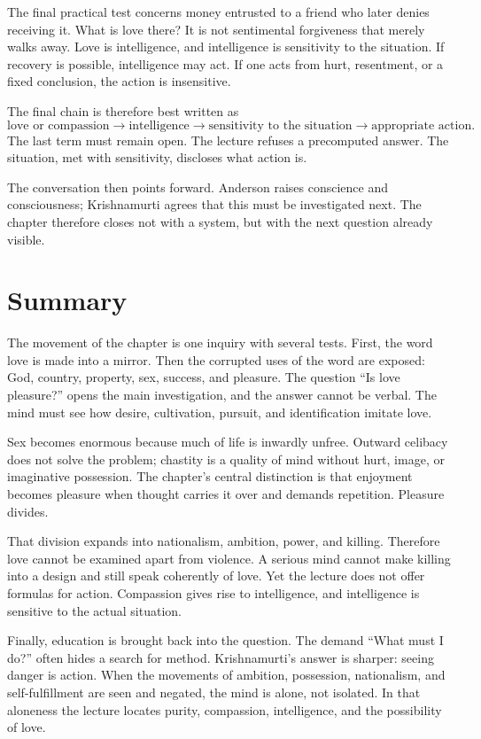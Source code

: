 The final practical test concerns money entrusted to a friend who later denies receiving it. What is love there? It is not sentimental forgiveness that merely walks away. Love is intelligence, and intelligence is sensitivity to the situation. If recovery is possible, intelligence may act. If one acts from hurt, resentment, or a fixed conclusion, the action is insensitive.

The final chain is therefore best written as
\begin{equation}
\text{love or compassion}
\longrightarrow
\text{intelligence}
\longrightarrow
\text{sensitivity to the situation}
\longrightarrow
\text{appropriate action}.
\end{equation}
The last term must remain open. The lecture refuses a precomputed answer. The situation, met with sensitivity, discloses what action is.

The conversation then points forward. Anderson raises conscience and consciousness; Krishnamurti agrees that this must be investigated next. The chapter therefore closes not with a system, but with the next question already visible.

\section{Summary}

The movement of the chapter is one inquiry with several tests. First, the word love is made into a mirror. Then the corrupted uses of the word are exposed: God, country, property, sex, success, and pleasure. The question ``Is love pleasure?'' opens the main investigation, and the answer cannot be verbal. The mind must see how desire, cultivation, pursuit, and identification imitate love.

Sex becomes enormous because much of life is inwardly unfree. Outward celibacy does not solve the problem; chastity is a quality of mind without hurt, image, or imaginative possession. The chapter's central distinction is that enjoyment becomes pleasure when thought carries it over and demands repetition. Pleasure divides.

That division expands into nationalism, ambition, power, and killing. Therefore love cannot be examined apart from violence. A serious mind cannot make killing into a design and still speak coherently of love. Yet the lecture does not offer formulas for action. Compassion gives rise to intelligence, and intelligence is sensitive to the actual situation.

Finally, education is brought back into the question. The demand ``What must I do?'' often hides a search for method. Krishnamurti's answer is sharper: seeing danger is action. When the movements of ambition, possession, nationalism, and self-fulfillment are seen and negated, the mind is alone, not isolated. In that aloneness the lecture locates purity, compassion, intelligence, and the possibility of love.